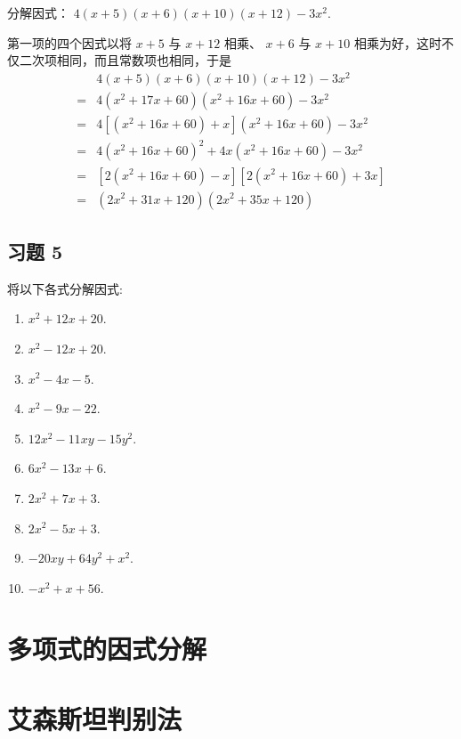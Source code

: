 \begin{example}
	分解因式： $4(x+5)(x+6)(x+10)(x+12)-3 x^{2}.$
\end{example}
\begin{solution}
	第一项的四个因式以将 $x+5$ 与 $x+12$ 相乘、 $x+6$ 与 $x+10$ 相乘为好，这时不仅二次项相同，而且常数项也相同，于是
	\begin{align*}
		  & 4(x+5)(x+6)(x+10)(x+12)-3 x^{2}                                                           \\
		= & 4\left(x^{2}+17 x+60\right)\left(x^{2}+16 x+60\right)-3 x^{2}                             \\
		= & 4\left[\left(x^{2}+16 x+60\right)+x\right]\left(x^{2}+16 x+60\right)-3 x^{2}              \\
		= & 4\left(x^{2}+16 x+60\right)^{2}+4 x\left(x^{2}+16 x+60\right)-3 x^{2}                     \\
		= & {\left[2\left(x^{2}+16 x+60\right)-x\right]\left[2\left(x^{2}+16 x+60\right)+3 x\right] } \\
		= & \left(2 x^{2}+31 x+120\right)\left(2 x^{2}+35 x+120\right)
	\end{align*}
\end{solution}

\subsection*{习题 5}
将以下各式分解因式:
\begin{enumerate}
	\item $ x^{2}+12 x+20$.
	\item $ x^{2}-12 x+20$.
	\item $ x^{2}-4 x-5$.
	\item $ x^{2}-9 x-22$.
	\item $12 x^{2}-11 x y-15 y^{2}$.
	\item $6 x^{2}-13 x+6$.
	\item $2 x^{2}+7 x+3$.
	\item $2 x^{2}-5 x+3$.
	\item $-20 x y+64 y^{2}+x^{2}$.
	\item $-x^{2}+x+56$.
\end{enumerate}


\section{多项式的因式分解}

\section{艾森斯坦判别法}
